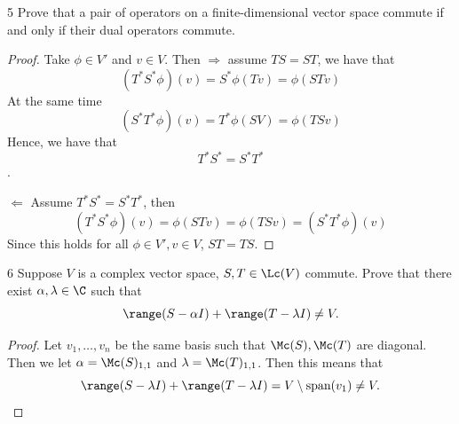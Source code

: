 \documentclass{extarticle}
\begin{document}
\begin{problem}{5}
    Prove that a pair of operators on a finite-dimensional vector space commute if and only if 
    their dual operators commute.
\end{problem}

\begin{proof}
Take \(\phi \in V'\) and \(v \in V\). Then \(\Rightarrow\) assume \(TS = ST\), we have that 
\[(T^* S^* \phi)(v) = S^* \phi(Tv) = \phi (STv)\]
At the same time 
\[(S^*T^* \phi)(v) = T^* \phi (SV) = \phi (TSv)\]
Hence, we have that \[T^*S^* = S^*T^*\]. 

\(\Leftarrow\) Assume \(T^* S^* = S^* T^*\), then 
\[(T^* S^* \phi)(v) = \phi(STv) = \phi (TSv) = (S^*T^* \phi)(v)\]
Since this holds for all \(\phi \in V', v \in V\), \(ST = TS\).
\end{proof}

\begin{problem}{6}
    Suppose \(V\) is a complex vector space, \(S,T \in \Lc(V)\) commute. Prove that there exist 
    \(\alpha, \lambda \in \C\) such that 
    \[\range (S - \alpha I) + \range (T - \lambda I) \neq V.\]
\end{problem}

\begin{proof}
Let \(v_1, \ldots, v_n\) be the same basis such that \(\Mc(S), \Mc(T)\) are diagonal. Then we let 
\(\alpha = \Mc(S)_{1,1}\) and \(\lambda = \Mc(T)_{1, 1}\). Then this means that 
\[\range (S - \lambda I) + \range (T - \lambda I) = V \setminus \text{span}(v_1) \neq V.\]
\end{proof}
\end{document}
